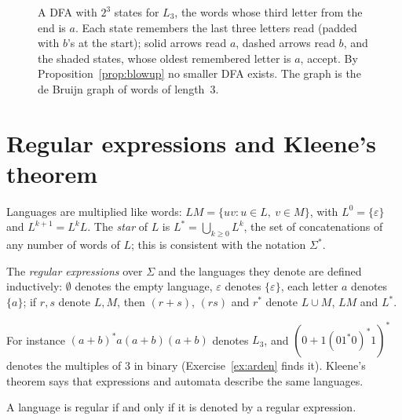\begin{figure}[ht]
\centering
{}
\caption{A DFA with $2^3$ states for $L_3$, the words whose third letter from the end is $a$. Each state remembers the last three letters read (padded with $b$'s at the start); solid arrows read $a$, dashed arrows read $b$, and the shaded states, whose oldest remembered letter is $a$, accept. By Proposition~\ref{prop:blowup} no smaller DFA exists. The graph is the de Bruijn graph of words of length~$3$.}
\label{fig:debruijn}
\end{figure}

\section{Regular expressions and Kleene's theorem}\label{sec:kleene}

Languages are multiplied like words: $LM=\{uv:u\in L,\ v\in M\}$, with $L^0=\{\varepsilon\}$ and $L^{k+1}=L^kL$. The \emph{star} of $L$ is $L^*=\bigcup_{k\ge0}L^k$, the set of concatenations of any number of words of $L$; this is consistent with the notation $\Sigma^*$.

\begin{definition}\label{def:regex}
The \emph{regular expressions} over $\Sigma$ and the languages they denote are defined inductively: $\emptyset$ denotes the empty language, $\varepsilon$ denotes $\{\varepsilon\}$, each letter $a$ denotes $\{a\}$; if $r,s$ denote $L,M$, then $(r+s)$, $(rs)$ and $r^*$ denote $L\cup M$, $LM$ and $L^*$.
\end{definition}

For instance $(a+b)^*a(a+b)(a+b)$ denotes $L_3$, and $(0+1(01^*0)^*1)^*$ denotes the multiples of $3$ in binary (Exercise~\ref{ex:arden} finds it). Kleene's theorem says that expressions and automata describe the same languages.

\begin{theorem}[Kleene, 1951]\label{thm:kleene}
A language is regular if and only if it is denoted by a regular expression.
\end{theorem}

